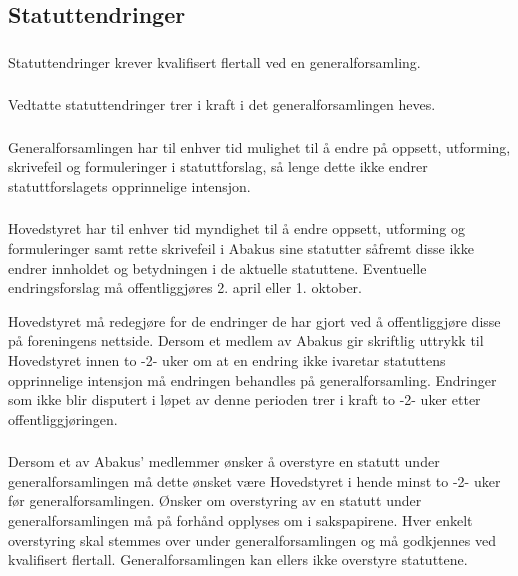 \subsection{Statuttendringer}
\subsubsection{}
Statuttendringer krever kvalifisert flertall ved en generalforsamling.

\subsubsection{}
Vedtatte statuttendringer trer i kraft i det generalforsamlingen heves.

\subsubsection{}
Generalforsamlingen har til enhver tid mulighet til å endre på oppsett,
utforming, skrivefeil og formuleringer i statuttforslag, så lenge dette ikke
endrer statuttforslagets opprinnelige intensjon.

\subsubsection{}
Hovedstyret har til enhver tid myndighet til å endre oppsett, utforming og
formuleringer samt rette skrivefeil i Abakus sine statutter såfremt disse ikke
endrer innholdet og betydningen i de aktuelle statuttene. Eventuelle
endringsforslag må offentliggjøres 2. april eller 1. oktober.

Hovedstyret må redegjøre for de endringer de har gjort ved å offentliggjøre
disse på foreningens nettside. Dersom et medlem av Abakus gir skriftlig uttrykk
til Hovedstyret innen to -2- uker om at en endring ikke ivaretar statuttens
opprinnelige intensjon må endringen behandles på generalforsamling. Endringer
som ikke blir disputert i løpet av denne perioden trer i kraft to -2- uker
etter offentliggjøringen.

\subsubsection{}
Dersom et av Abakus' medlemmer ønsker å overstyre en statutt under
generalforsamlingen må dette ønsket være Hovedstyret i hende minst to -2- uker
før generalforsamlingen. Ønsker om overstyring av en statutt under
generalforsamlingen må på forhånd opplyses om i sakspapirene. Hver enkelt
overstyring skal stemmes over under generalforsamlingen og må godkjennes ved
kvalifisert flertall. Generalforsamlingen kan ellers ikke overstyre statuttene.

